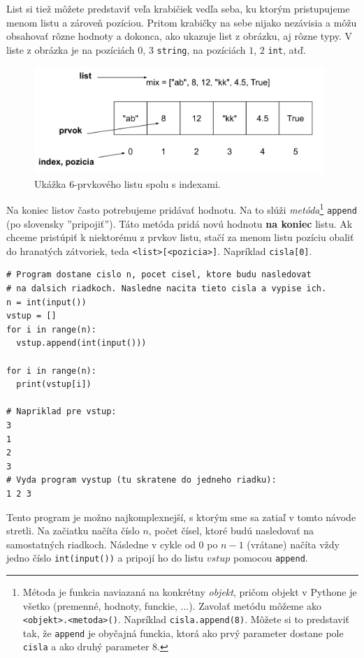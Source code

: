 \documentclass{article}
\begin{document}
List si tiež môžete predstaviť veľa krabičiek vedľa seba, ku ktorým pristupujeme menom listu a zároveň pozíciou. Pritom krabičky na sebe nijako nezávisia a môžu obsahovať rôzne hodnoty a dokonca, ako ukazuje list z obrázku, aj rôzne typy. V liste z obrázka je na pozíciách $0$, $3$ \texttt{string}, na pozíciách $1$, $2$ \texttt{int}, atď.
\begin{figure}[h]
\includegraphics[width=11cm]{list}
\centering
\caption{Ukážka 6-prvkového listu spolu s indexami.}
\end{figure}
Na koniec listov často potrebujeme pridávať hodnotu. Na to slúži \textit{metóda}\footnote{Métoda je funkcia naviazaná na konkrétny \textit{objekt}, pričom objekt v Pythone je všetko (premenné, hodnoty, funckie, ...). Zavolať metódu môžeme ako \texttt{<objekt>.<metoda>()}. Napríklad \texttt{cisla.append(8)}. Môžete si to predstaviť tak, že \texttt{append} je obyčajná funckia, ktorá ako prvý parameter dostane pole \texttt{cisla} a ako druhý parameter $8$.}  \texttt{append} (po slovensky ''pripojiť''). Táto metóda pridá novú hodnotu \textbf{na koniec} listu. Ak chceme pristúpiť k niektorému z prvkov listu, stačí za menom listu pozíciu obaliť do hranatých zátvoriek, teda \texttt{<list>[<pozicia>]}. Napríklad \texttt{cisla[0]}.
\begin{lstlisting}
# Program dostane cislo n, pocet cisel, ktore budu nasledovat
# na dalsich riadkoch. Nasledne nacita tieto cisla a vypise ich.
n = int(input())
vstup = []
for i in range(n):
  vstup.append(int(input()))

for i in range(n):
  print(vstup[i])

# Napriklad pre vstup:
3
1
2
3
# Vyda program vystup (tu skratene do jedneho riadku):
1 2 3
\end{lstlisting}

Tento program je možno najkomplexnejší, s ktorým sme sa zatiaľ v tomto návode stretli. Na začiatku načíta číslo $n$, počet čísel, ktoré budú nasledovať na samostatných riadkoch. Následne v cykle od $0$ po $n - 1$ (vrátane) načíta vždy jedno číslo \texttt{int(input())} a pripojí ho do listu $vstup$ pomocou \texttt{append}.
\end{document}
